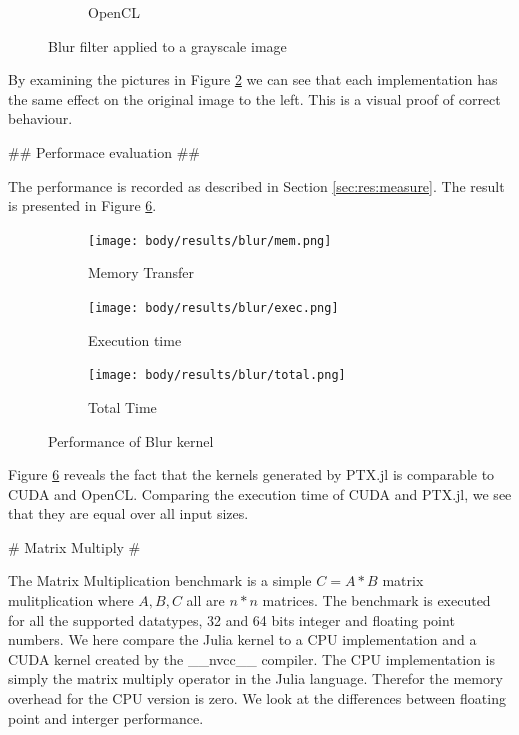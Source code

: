 \begin{markdown}
\begin{figure}[H]
\begin{subfigure}{.49\textwidth}
    \caption{OpenCL}
    \label{fig:res:blur:pic:opencl}
  \end{subfigure}
  \caption{Blur filter applied to a grayscale image}
  \label{fig:res:blur:pic}
\end{figure}


By examining the pictures in Figure \ref{fig:res:blur:pic} we can see
that each implementation has the same effect on the original image to
the left. This is a visual proof of correct behaviour.

## Performace evaluation ##

The performance is recorded as described in Section
\ref{sec:res:measure}. The result is presented in Figure \ref{fig:res:blur}.

\begin{figure}[H]
  \centering
  \begin{subfigure}{.33\textwidth}
    \centering
    \texttt{[image: body/results/blur/mem.png]}
    \caption{Memory Transfer}
    \label{fig:res:blur:int32:mem}
  \end{subfigure}%
  \begin{subfigure}{.33\textwidth}
    \centering
    \texttt{[image: body/results/blur/exec.png]}
    \caption{Execution time}
    \label{fig:res:blur:int32:exec}
  \end{subfigure}%
  \begin{subfigure}{.33\textwidth}
    \centering
    \texttt{[image: body/results/blur/total.png]}
    \caption{Total Time}
    \label{fig:res:blur:int32:tot}
  \end{subfigure}%
  \caption{Performance of Blur kernel}
  \label{fig:res:blur}
\end{figure}

Figure \ref{fig:res:blur} reveals the fact that the kernels generated
by PTX.jl is comparable to CUDA and OpenCL. Comparing the execution
time of CUDA and PTX.jl, we see that they are equal over all input
sizes. 

# Matrix Multiply #
\label{sec:res:mm}


The Matrix Multiplication benchmark is a simple $C = A * B$ matrix
mulitplication where $A, B, C$ all are $n*n$ matrices. The benchmark
is executed for all the supported datatypes, 32 and 64 bits integer
and floating point numbers. We here compare the Julia kernel to a CPU
implementation and a CUDA kernel created by the __nvcc__ compiler.
The CPU implementation is simply the matrix multiply operator in the
Julia language. Therefor the memory overhead for the CPU version is
zero. We look at the differences between floating point and interger
performance.


\end{markdown}
